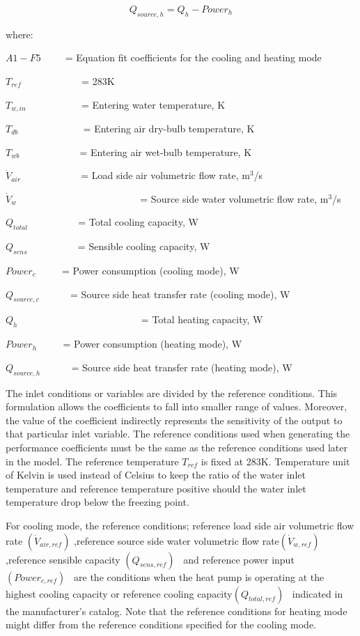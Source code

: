 \begin{equation}
{Q_{source,h}} = {Q_h} - Powe{r_h}
\end{equation}

where:

\(A1 - F5\) ~ ~~ = Equation fit coefficients for the cooling and heating mode

\({{T_{ref}}}\) ~~~~~~~~~~~ = 283K

\({{T_{w,in}}}\) ~~~~~~~~~~ = Entering water temperature, K

\({{T_{db}}}\) ~~~~~~~~~~~~ = Entering air dry-bulb temperature, K

\({{T_{wb}}}\) ~~~~~~~~~~~ = Entering air wet-bulb temperature, K

\({{{\dot V}_{air}}}\) ~~~~~~~~~~~ = Load side air volumetric flow rate, m\(^{3}\)/s

\({{{\dot V}_{w}}}\) ~~~~~~~~~~~~~~~~~~~~~~~~ = Source side water volumetric flow rate, m\(^{3}\)/s

\({{Q_{total}}}\) ~~~~~~~~~ = Total cooling capacity, W

\({{Q_{sens}}}\) ~~~~~~~~~ = Sensible cooling capacity, W

\({Powe{r_c}}\) ~~~~ = Power consumption (cooling mode), W

\({{Q_{source,c}}}\) ~~~~~ = Source side heat transfer rate (cooling mode), W

\({{Q_{h}}}\) ~~~~~~~~~~~~~~~~~~~~~~~~ = Total heating capacity, W

\({Powe{r_h}}\) ~~~~ = Power consumption (heating mode), W

\({{Q_{source,h}}}\) ~~~~~ = Source side heat transfer rate (heating mode), W

The inlet conditions or variables are divided by the reference conditions. This formulation allows the coefficients to fall into smaller range of values. Moreover, the value of the coefficient indirectly represents the sensitivity of the output to that particular inlet variable. The reference conditions used when generating the performance coefficients must be the same as the reference conditions used later in the model. The reference temperature \({{T_{ref}}}\) is fixed at 283K. Temperature unit of Kelvin is used instead of Celsius to keep the ratio of the water inlet temperature and reference temperature positive should the water inlet temperature drop below the freezing point.

For cooling mode, the reference conditions; reference load side air volumetric flow rate \(\left( {{{\dot V}_{air,ref}}} \right)\) ,reference source side water volumetric flow rate\(\left( {{{\dot V}_{w,ref}}} \right)\) ,reference sensible capacity \(\left( {{Q_{sens,ref}}} \right)\) ~and reference power input \(\left( {Powe{r_{c,ref}}} \right)\) ~are the conditions when the heat pump is operating at the highest cooling capacity or reference cooling capacity\(\left( {{Q_{total,ref}}} \right)\) ~indicated in the manufacturer's catalog. Note that the reference conditions for heating mode might differ from the reference conditions specified for the cooling mode.

